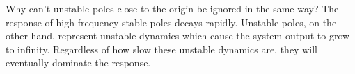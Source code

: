 Why can't unstable poles close to the origin be ignored in the same way? The
response of high frequency stable poles decays rapidly. Unstable poles, on the
other hand, represent unstable dynamics which cause the \gls{system}
\gls{output} to grow to infinity. Regardless of how slow these unstable dynamics
are, they will eventually dominate the response.
